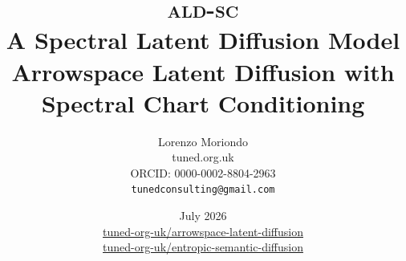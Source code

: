 \documentclass[11pt]{article}
\newcommand{\ALDSC}{\textsc{ald-sc}}
\begin{document}

\title{%
  \textbf{ \ALDSC \\A Spectral Latent Diffusion Model\\
  \large \normalfont Arrowspace Latent Diffusion with Spectral Chart Conditioning}
}

\author{%
  Lorenzo Moriondo \\[2pt]   \small tuned.org.uk\\   \small ORCID: 0000-0002-8804-2963\\   \texttt{tunedconsulting@gmail.com} }  \date{July 2026 \\
    \href{https://github.com/tuned-org-uk/arrowspace-latent-diffusion}{%
     \textsc{\Large\faGithub} tuned-org-uk/arrowspace-latent-diffusion} \\
     \href{https://github.com/tuned-org-uk/entropic-semantic-diffusion}{%
     \textsc{\Large\faGithub} tuned-org-uk/entropic-semantic-diffusion}
  }
    \maketitle
\end{document}
